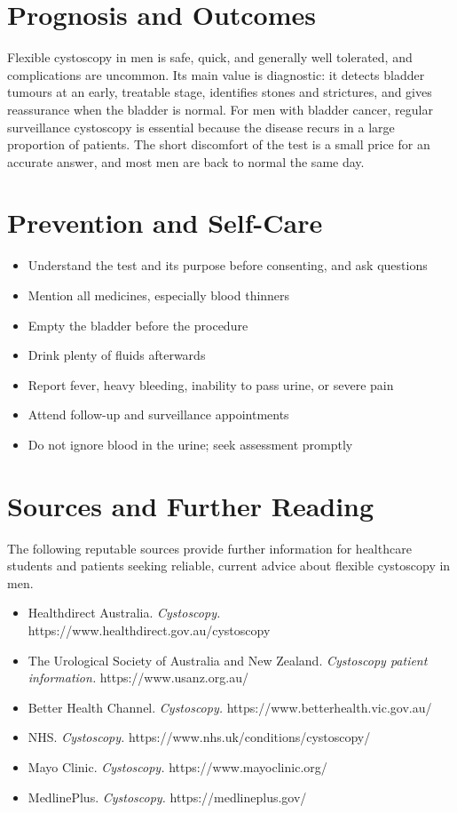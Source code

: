 \section*{Prognosis and Outcomes}
Flexible cystoscopy in men is safe, quick, and generally well tolerated, and complications are uncommon. Its main value is diagnostic: it detects bladder tumours at an early, treatable stage, identifies stones and strictures, and gives reassurance when the bladder is normal. For men with bladder cancer, regular surveillance cystoscopy is essential because the disease recurs in a large proportion of patients. The short discomfort of the test is a small price for an accurate answer, and most men are back to normal the same day.

\section*{Prevention and Self-Care}
\begin{itemize}
    \item Understand the test and its purpose before consenting, and ask questions
    \item Mention all medicines, especially blood thinners
    \item Empty the bladder before the procedure
    \item Drink plenty of fluids afterwards
    \item Report fever, heavy bleeding, inability to pass urine, or severe pain
    \item Attend follow-up and surveillance appointments
    \item Do not ignore blood in the urine; seek assessment promptly
\end{itemize}

\section*{Sources and Further Reading}
The following reputable sources provide further information for healthcare students and patients seeking reliable, current advice about flexible cystoscopy in men.
\begin{itemize}
    \item Healthdirect Australia. \textit{Cystoscopy.} https://www.healthdirect.gov.au/cystoscopy
    \item The Urological Society of Australia and New Zealand. \textit{Cystoscopy patient information.} https://www.usanz.org.au/
    \item Better Health Channel. \textit{Cystoscopy.} https://www.betterhealth.vic.gov.au/
    \item NHS. \textit{Cystoscopy.} https://www.nhs.uk/conditions/cystoscopy/
    \item Mayo Clinic. \textit{Cystoscopy.} https://www.mayoclinic.org/
    \item MedlinePlus. \textit{Cystoscopy.} https://medlineplus.gov/
\end{itemize}
